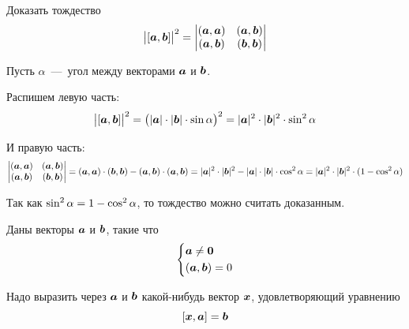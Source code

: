 \documentclass[a4paper,12pt]{article}
\begin{document}
  
  \begin{problem}[3.13(1)]
    Доказать тождество
    \[
      \bigl| [\boldsymbol a, \boldsymbol b] \bigr|^2 = \begin{vmatrix}
        (\boldsymbol a, \boldsymbol a) & (\boldsymbol a, \boldsymbol b)\\
        (\boldsymbol a, \boldsymbol b) & (\boldsymbol b, \boldsymbol b)
      \end{vmatrix}
    \]
  \end{problem}
  
  \begin{solution}
    Пусть $\alpha$~---~угол между векторами $\boldsymbol a$ и $\boldsymbol b$.
    
    Распишем левую часть:
    \[
      \bigl| [\boldsymbol a, \boldsymbol b] \bigr|^2
      = \bigl(|\boldsymbol a| \cdot |\boldsymbol b| \cdot \sin\alpha\bigr)^2
      = |\boldsymbol a|^2 \cdot |\boldsymbol b|^2 \cdot \sin^2\alpha
    \]
    
    И правую часть:
    \[
      \begin{vmatrix}
        (\boldsymbol a, \boldsymbol a) & (\boldsymbol a, \boldsymbol b)\\
        (\boldsymbol a, \boldsymbol b) & (\boldsymbol b, \boldsymbol b)
      \end{vmatrix}
      = (\boldsymbol a, \boldsymbol a) \cdot (\boldsymbol b, \boldsymbol b) - (\boldsymbol a, \boldsymbol b) \cdot (\boldsymbol a, \boldsymbol b)
      = |\boldsymbol a|^2 \cdot |\boldsymbol b|^2 - |\boldsymbol a| \cdot |\boldsymbol b| \cdot \cos^2\alpha
      = |\boldsymbol a|^2 \cdot |\boldsymbol b|^2 \cdot (1 - \cos^2\alpha)
    \]
    
    Так как $\sin^2\alpha \hm= 1 \hm- \cos^2\alpha$, то тождество можно считать доказанным.
  \end{solution}
  
  
  \begin{problem}[3.15 (близкая к 3.16)]
    Даны векторы $\boldsymbol a$ и $\boldsymbol b$, такие что
    \[
      \left\{
        \begin{aligned}
          &\boldsymbol a \not= \boldsymbol 0\\
          &(\boldsymbol a, \boldsymbol b) = 0
        \end{aligned}
      \right.
    \]
    
    Надо выразить через $\boldsymbol a$ и $\boldsymbol b$ какой-нибудь вектор $\boldsymbol x$, удовлетворяющий уравнению
    \[
      [\boldsymbol x, \boldsymbol a] = \boldsymbol b
    \]
  \end{problem}
  
\end{document}
